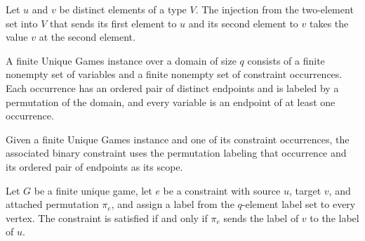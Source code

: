 \begin{theorem}
\label{FABL.binaryInjectiveScope_one}
\leanok
{}
Let $u$ and $v$ be distinct elements of a type $V$. The injection from the two-element
set into $V$ that sends its first element to $u$ and its second element to $v$ takes the
value $v$ at the second element.
\end{theorem}

\begin{definition}
\label{FABL.FiniteUniqueGame}
\leanok
A finite Unique Games instance over a domain of size $q$ consists of a finite nonempty
set of variables and a finite nonempty set of constraint occurrences. Each occurrence
has an ordered pair of distinct endpoints and is labeled by a permutation of the domain,
and every variable is an endpoint of at least one occurrence.
\end{definition}

\begin{definition}
\label{FABL.FiniteUniqueGame.constraint}
\leanok
{}
Given a finite Unique Games instance and one of its constraint occurrences, the
associated binary constraint uses the permutation labeling that occurrence and its
ordered pair of endpoints as its scope.
\end{definition}

\begin{theorem}
\label{FABL.FiniteUniqueGame.constraint_satisfied_iff}
\leanok
{}
Let $G$ be a finite unique game, let $e$ be a constraint with source $u$, target $v$,
and attached permutation $\pi_e$, and assign a label from the $q$-element label set to
every vertex. The constraint is satisfied if and only if $\pi_e$ sends the label of $v$
to the label of $u$.
\end{theorem}

